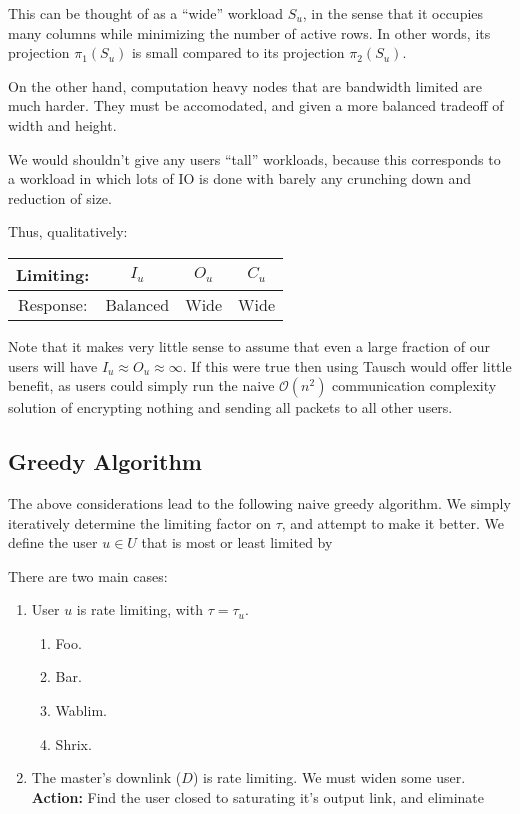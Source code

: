 \documentclass[12pt]{article}
\begin{document}
This can be thought of as a ``wide'' workload $S_u$, in the sense that it occupies many columns while minimizing the number of active rows.
In other words, its projection $\pi_1(S_u)$ is small compared to its projection $\pi_2(S_u)$.

On the other hand, computation heavy nodes that are bandwidth limited are much harder.
They must be accomodated, and given a more balanced tradeoff of width and height.

We would shouldn't give any users ``tall'' workloads, because this corresponds to a workload in which lots of IO is done with barely any crunching down and reduction of size.

Thus, qualitatively:
\begin{center}
\begin{tabular}{c|c|c|c}
Limiting: & $I_u$    & $O_u$ & $C_u$ \\\hline
Response: & Balanced & Wide  & Wide
\end{tabular}
\end{center}

Note that it makes very little sense to assume that even a large fraction of our users will have $I_u \approx O_u \approx \infty$.
If this were true then using Tausch would offer little benefit, as users could simply run the naive $\mathcal{O}(n^2)$ communication complexity solution of encrypting nothing and sending all packets to all other users.

\subsection{Greedy Algorithm}
The above considerations lead to the following naive greedy algorithm.
We simply iteratively determine the limiting factor on $\tau$, and attempt to make it better.
We define the user $u \in U$ that is most or least limited by 

There are two main cases:
\renewcommand{\labelenumi}{\textit{\Roman{enumi}.}}
\renewcommand{\labelenumii}{\textbf{\Roman{enumii}.}}
\begin{enumerate}
\item User $u$ is rate limiting, with $\tau = \tau_u$.
\begin{enumerate}
\item Foo.
\item Bar.
\item Wablim.
\item Shrix.
\end{enumerate}
\item The master's downlink ($D$) is rate limiting.
We must widen some user.
\textbf{Action:} Find the user closed to saturating it's output link, and eliminate 
\end{enumerate}
\end{document}
